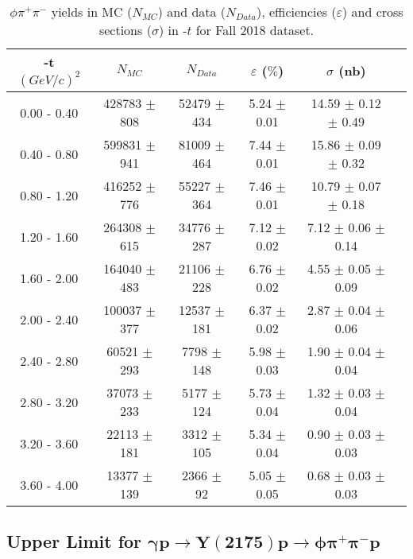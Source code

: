\begin{center}
\begin{table}[H]
    \centering
    \caption{$\phi \pi^{+}\pi^{-}$ yields in MC ($N_{MC}$) and data ($N_{Data}$), efficiencies ($\varepsilon$) and cross sections ($\sigma$) in -$t$ for Fall 2018 dataset.}
    \label{tab.xsec_ul.phi2pi.4.2}
    \begin{tabular}{|c|c|c|c|c|c|}
    \hline
    -t $(GeV/c)^{2}$ & $N_{MC}$ & $N_{Data}$ & $\varepsilon$ ($\%$) & $\sigma$ (nb) \\ 
    \hline
    0.00 - 0.40 & 428783 $\pm$ 808 & 52479 $\pm$ 434 & 5.24 $\pm$ 0.01 & 14.59 $\pm$ 0.12 $\pm$ 0.49 \\ 
    0.40 - 0.80 & 599831 $\pm$ 941 & 81009 $\pm$ 464 & 7.44 $\pm$ 0.01 & 15.86 $\pm$ 0.09 $\pm$ 0.32 \\ 
    0.80 - 1.20 & 416252 $\pm$ 776 & 55227 $\pm$ 364 & 7.46 $\pm$ 0.01 & 10.79 $\pm$ 0.07 $\pm$ 0.18 \\ 
    1.20 - 1.60 & 264308 $\pm$ 615 & 34776 $\pm$ 287 & 7.12 $\pm$ 0.02 & 7.12 $\pm$ 0.06 $\pm$ 0.14 \\ 
    1.60 - 2.00 & 164040 $\pm$ 483 & 21106 $\pm$ 228 & 6.76 $\pm$ 0.02 & 4.55 $\pm$ 0.05 $\pm$ 0.09 \\ 
    2.00 - 2.40 & 100037 $\pm$ 377 & 12537 $\pm$ 181 & 6.37 $\pm$ 0.02 & 2.87 $\pm$ 0.04 $\pm$ 0.06 \\ 
    2.40 - 2.80 & 60521 $\pm$ 293 & 7798 $\pm$ 148 & 5.98 $\pm$ 0.03 & 1.90 $\pm$ 0.04 $\pm$ 0.04 \\ 
    2.80 - 3.20 & 37073 $\pm$ 233 & 5177 $\pm$ 124 & 5.73 $\pm$ 0.04 & 1.32 $\pm$ 0.03 $\pm$ 0.04 \\ 
    3.20 - 3.60 & 22113 $\pm$ 181 & 3312 $\pm$ 105 & 5.34 $\pm$ 0.04 & 0.90 $\pm$ 0.03 $\pm$ 0.03 \\ 
    3.60 - 4.00 & 13377 $\pm$ 139 & 2366 $\pm$ 92 & 5.05 $\pm$ 0.05 & 0.68 $\pm$ 0.03 $\pm$ 0.03 \\  
   \hline
\end{tabular}
\end{table}
\null
\vfill
\end{center}

\newpage
\subsection{Upper Limit for \texorpdfstring{$\bm{\gamma p \rightarrow Y(2175) p \rightarrow \phi \pi^{+} \pi^{-} p}$}{}}
\label{sec.xsec_ul.yphi2pi}


